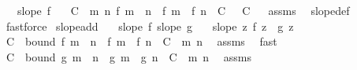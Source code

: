 \begin{isabellebody}
\ \ \ {\isachardoublequoteopen}slope\ f{\isachardoublequoteclose}\isanewline
\ \ \ C\ \ {\isachardoublequoteopen}{\isasymAnd}m\ n{\isachardot}{\kern0pt}\ {\isasymbar}f\ {\isacharparenleft}{\kern0pt}m\ {\isacharplus}{\kern0pt}\ n{\isacharparenright}{\kern0pt}\ {\isacharminus}{\kern0pt}\ {\isacharparenleft}{\kern0pt}f\ m\ {\isacharplus}{\kern0pt}\ f\ n{\isacharparenright}{\kern0pt}{\isasymbar}\ {\isasymle}\ C{\isachardoublequoteclose}\ {\isachardoublequoteopen}{}\ {\isasymle}\ C{\isachardoublequoteclose}%
\isadelimproof
\ %
\endisadelimproof
%
\isatagproof
{}\isamarkupfalse%
\ assms\ \isamarkupfalse%
\ slope{\isacharunderscore}{\kern0pt}def\ \isamarkupfalse%
\ fastforce%
\endisatagproof
{\isafoldproof}%
%
\isadelimproof
%
\endisadelimproof
\isanewline
\isanewline
{}\isamarkupfalse%
\ slope{\isacharunderscore}{\kern0pt}add{\isacharcolon}{\kern0pt}\isanewline
\ \ \ {\isachardoublequoteopen}slope\ f{\isachardoublequoteclose}\ {\isachardoublequoteopen}slope\ g{\isachardoublequoteclose}\isanewline
\ \ \ {\isachardoublequoteopen}slope\ {\isacharparenleft}{\kern0pt}{\isasymlambda}z{\isachardot}{\kern0pt}\ f\ z\ {\isacharplus}{\kern0pt}\ g\ z{\isacharparenright}{\kern0pt}{\isachardoublequoteclose}\isanewline
%
\isadelimproof
%
\endisadelimproof
%
\isatagproof
{}\isamarkupfalse%
\ {\isacharminus}{\kern0pt}\isanewline
\ \ \isamarkupfalse%
\ C\ \ bound{\isacharcolon}{\kern0pt}\ {\isachardoublequoteopen}{\isasymbar}f\ {\isacharparenleft}{\kern0pt}m\ {\isacharplus}{\kern0pt}\ n{\isacharparenright}{\kern0pt}\ {\isacharminus}{\kern0pt}\ {\isacharparenleft}{\kern0pt}f\ m\ {\isacharplus}{\kern0pt}\ f\ n{\isacharparenright}{\kern0pt}{\isasymbar}\ {\isasymle}\ C{\isachardoublequoteclose}\ \ m\ n\ \isamarkupfalse%
\ assms\ \isamarkupfalse%
\ fast\isanewline
\ \ \isamarkupfalse%
\ C{\isacharprime}{\kern0pt}\ \ bound{\isacharprime}{\kern0pt}{\isacharcolon}{\kern0pt}\ {\isachardoublequoteopen}{\isasymbar}g\ {\isacharparenleft}{\kern0pt}m\ {\isacharplus}{\kern0pt}\ n{\isacharparenright}{\kern0pt}\ {\isacharminus}{\kern0pt}\ {\isacharparenleft}{\kern0pt}g\ m\ {\isacharplus}{\kern0pt}\ g\ n{\isacharparenright}{\kern0pt}{\isasymbar}\ {\isasymle}\ C{\isacharprime}{\kern0pt}{\isachardoublequoteclose}\ \ m\ n\ \isamarkupfalse%
\ assms\ \isamarkupfalse%

\end{isabellebody}
